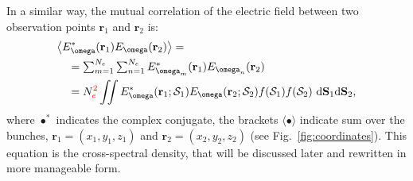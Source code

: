 \documentclass{iucr}              %
\newcommand{\todo}[1]{{\color{red}[TODO: "#1'']}}
\newcommand{\inred}[1]{{\color{red}#1}}
\begin{document}

In a similar way, the mutual correlation of the electric field between two observation points $\textbf{r}_1$ and $\textbf{r}_2$ is:
\begin{equation}\label{eq:CSDallaChubar}
\begin{split}
      &\big\langle E^*_{\omega}(\textbf{r}_1) E_{\omega}(\textbf{r}_2)\big\rangle = \\
      &\quad = \sum_{m=1}^{N_e} \sum_{n=1}^{N_e} E^*_{\omega_{m}}(\textbf{r}_1) E_{\omega_{n}}(\textbf{r}_2)\\
      &\quad = N_e^\inred{2}\iint
      E^*_{\omega}(\textbf{r}_1;\mathcal{S}_1)
      E_{\omega}(\textbf{r}_2;\mathcal{S}_2)
      f(\mathcal{S}_1) f(\mathcal{S}_2)~
      \text{d}\textbf{S}_1 \text{d}\textbf{S}_2,
\end{split}
\end{equation}
where $\bullet^*$ indicates the complex conjugate, the brackets $\langle \bullet \rangle$ indicate sum over the bunches, $\textbf{r}_1=(x_1,y_1,z_1)$ and $\textbf{r}_2=(x_2,y_2,z_2)$ (see Fig.~\ref{fig:coordinates}). This equation is the cross-spectral density, that will be discussed later and rewritten in more manageable form.

\end{document}
